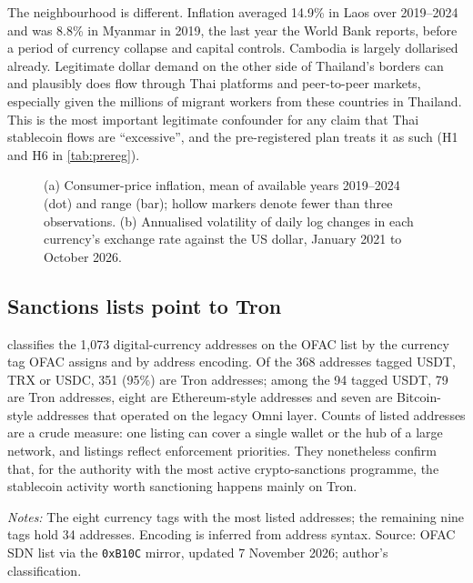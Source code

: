 The neighbourhood is different. Inflation averaged 14.9\% in Laos over 2019--2024 and was 8.8\% in Myanmar in 2019, the
last year the World Bank reports, before a period of currency collapse and capital controls. Cambodia is largely
dollarised already. Legitimate dollar demand on the other side of Thailand's borders can and plausibly does flow
through Thai platforms and peer-to-peer markets, especially given the millions of migrant workers from these countries
in Thailand. This is the most important legitimate confounder for any claim that Thai stablecoin flows are
``excessive'', and the pre-registered plan treats it as such (H1 and H6 in \cref{tab:prereg}).

\begin{figure}[!htbp]
\centering
{}
\caption{(a) Consumer-price inflation, mean of available years 2019--2024 (dot) and range (bar); hollow markers denote
fewer than three observations. (b) Annualised volatility of daily log changes in each currency's exchange rate against
the US dollar, January 2021 to October 2026.}
\label{fig:macro}
\end{figure}

\subsection{Sanctions lists point to Tron}\label{sec:ofac}

 classifies the 1,073 digital-currency addresses on the OFAC list by the currency tag OFAC assigns and by
address encoding. Of the 368 addresses tagged USDT, TRX or USDC, 351 (95\%) are Tron addresses; among the 94 tagged
USDT, 79 are Tron addresses, eight are Ethereum-style addresses and seven are Bitcoin-style addresses that operated on
the legacy Omni layer. Counts of listed addresses are a crude measure: one listing can cover a single wallet or the hub
of a large network, and listings reflect enforcement priorities. They nonetheless confirm that, for the authority with
the most active crypto-sanctions programme, the stablecoin activity worth sanctioning happens mainly on Tron.

\begin{table}[!htbp]
\centering\small
\begin{threeparttable}
\caption{OFAC-listed digital-currency addresses by currency tag and address encoding}
\label{tab:ofac}

\begin{tablenotes}[flushleft]\footnotesize
\item \emph{Notes:} The eight currency tags with the most listed addresses; the remaining nine tags hold 34 addresses.
Encoding is inferred from address syntax. Source: OFAC SDN list via the \texttt{0xB10C} mirror, updated
7 November 2026; author's classification.
\end{tablenotes}
\end{threeparttable}
\end{table}

